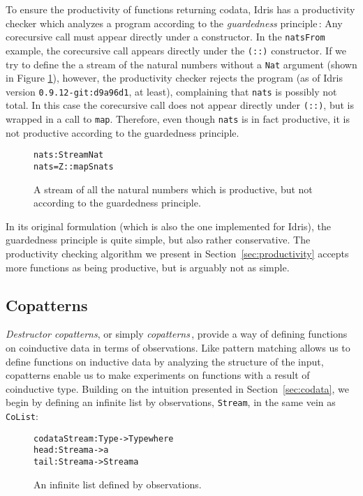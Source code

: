 To ensure the productivity of functions returning codata, Idris has a productivity checker which analyzes a program according to the \emph{guardedness} principle\,\citep{Coquand94,Gimenez95}: Any corecursive call must appear directly under a constructor. In the \texttt{natsFrom} example, the corecursive call appears directly under the \texttt{(::)} constructor. If we try to define the a stream of the natural numbers without a \texttt{Nat} argument (shown in Figure \ref{fig:nats}), however, the productivity checker rejects the program (as of Idris version \texttt{0.9.12-git:d9a96d1}, at least), complaining that \texttt{nats} is possibly not total. In this case the corecursive call does not appear directly under \texttt{(::)}, but is wrapped in a call to \texttt{map}. Therefore, even though \texttt{nats} is in fact productive, it is not productive according to the guardedness principle.

\begin{figure}
\begin{alltt}
nats : Stream Nat
nats = Z :: map S nats
\end{alltt}
\caption{A stream of all the natural numbers which is productive, but not according to the guardedness principle.}
\label{fig:nats}
\end{figure}

In its original formulation (which is also the one implemented for Idris), the guardedness principle is quite simple, but also rather conservative. The productivity checking algorithm we present in Section~\ref{sec:productivity} accepts more functions as being productive, but is arguably not as simple.

\subsection{Copatterns}
\label{sec:copatterns}
\emph{Destructor copatterns}, or simply \emph{copatterns}\,\citep{Abel13Copatterns}, provide a way of defining functions on coinductive data in terms of observations. Like pattern matching allows us to define functions on inductive data by analyzing the structure of the input, copatterns enable us to make experiments on functions with a result of coinductive type. Building on the intuition presented in Section~\ref{sec:codata}, we begin by defining an infinite list by observations, \texttt{Stream}, in the same vein as \texttt{CoList}:

\begin{figure}
\begin{alltt}
codata Stream : Type -> Type where
  head : Stream a -> a
  tail : Stream a -> Stream a 
\end{alltt}
\caption{An infinite list defined by observations.}
\label{fig:stream}
\end{figure}

